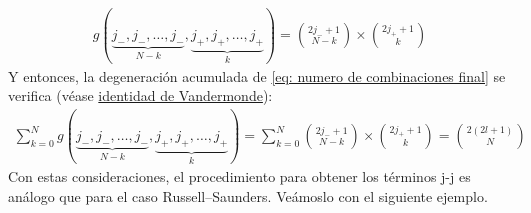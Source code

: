 \begin{align*}
g(\underbrace{j_{-}, j_{-}, \dots, j_{-}}_{N-k}, \underbrace{j_{+}, j_{+}, \dots, j_{+}}_{k}) = \binom{2j_{-}+1}{N-k} \times \binom{2j_{+}+1}{k}
\end{align*}
Y entonces, la degeneración acumulada de \eqref{eq: numero de combinaciones final} se verifica (véase \href{https://en.wikipedia.org/wiki/Vandermonde%27s_identity}{identidad de Vandermonde}): 
\begin{align*}
\sum_{k=0}^{N} g(\underbrace{j_{-}, j_{-}, \dots, j_{-}}_{N-k}, \underbrace{j_{+}, j_{+}, \dots, j_{+}}_{k}) = \sum_{k=0}^{N} \binom{2j_{-}+1}{N-k} \times \binom{2j_{+}+1}{k} = \binom{2(2l+1)}{N}
\end{align*}
Con estas consideraciones, el procedimiento para obtener los términos j-j es análogo que para el caso Russell--Saunders. Veámoslo con el siguiente ejemplo.
